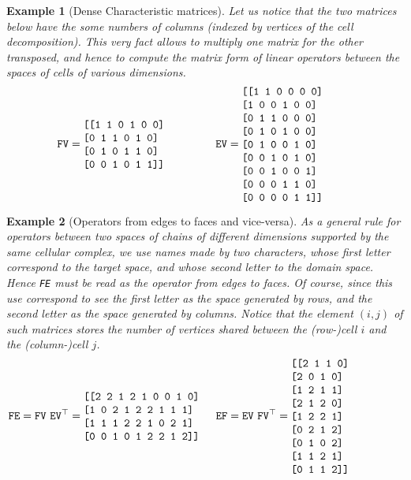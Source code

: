 \documentclass[11pt,oneside]{article}	%
\newtheorem{example}{Example}
\begin{document}
\begin{example}[Dense Characteristic matrices]\label{ex:denseMat}
Let us notice that the two matrices below have the some numbers of columns (indexed by vertices of the cell decomposition).
This very fact allows to multiply one matrix for the other transposed, and hence to compute the matrix form of linear operators between the spaces of cells of various dimensions.
\[
\texttt{FV} =
\begin{minipage}[c]{0.29\linewidth}
\begin{verbatim}
[[1 1 0 1 0 0]
 [0 1 1 0 1 0]
 [0 1 0 1 1 0]
 [0 0 1 0 1 1]]
\end{verbatim}
\end{minipage}
\qquad
\texttt{EV} =
\begin{minipage}[c]{0.29\linewidth}
\begin{verbatim}
[[1 1 0 0 0 0]
 [1 0 0 1 0 0]
 [0 1 1 0 0 0]
 [0 1 0 1 0 0]
 [0 1 0 0 1 0]
 [0 0 1 0 1 0]
 [0 0 1 0 0 1]
 [0 0 0 1 1 0]
 [0 0 0 0 1 1]]
\end{verbatim}
\end{minipage}
\]
\end{example}

\begin{example}[Operators from edges to faces and vice-versa]\label{ex:denseMat}
As a general rule for operators between two spaces of chains of different dimensions supported by the \emph{same} cellular complex, we use names made by two characters, whose first letter correspond to the target space, and whose second letter to the domain space. Hence \texttt{FE} must be read as the operator from edges to faces. Of course, since this use correspond to see the first letter as the space generated by rows, and the second letter as the space generated by columns. Notice that the element $(i,j)$ of such matrices stores the number of vertices shared between the (row-)cell $i$ and the (column-)cell $j$.
\[
\texttt{FE} = \texttt{FV}\ \texttt{EV}^\top = 
\begin{minipage}[c]{0.29\linewidth}
\begin{verbatim}
[[2 2 1 2 1 0 0 1 0]
 [1 0 2 1 2 2 1 1 1]
 [1 1 1 2 2 1 0 2 1]
 [0 0 1 0 1 2 2 1 2]]
\end{verbatim}
\end{minipage}
\qquad
\texttt{EF} = \texttt{EV}\ \texttt{FV}^\top = 
\begin{minipage}[c]{0.29\linewidth}
\begin{verbatim}
[[2 1 1 0]
 [2 0 1 0]
 [1 2 1 1]
 [2 1 2 0]
 [1 2 2 1]
 [0 2 1 2]
 [0 1 0 2]
 [1 1 2 1]
 [0 1 1 2]]
\end{verbatim}
\end{minipage}
\]
\end{example}
\end{document}
